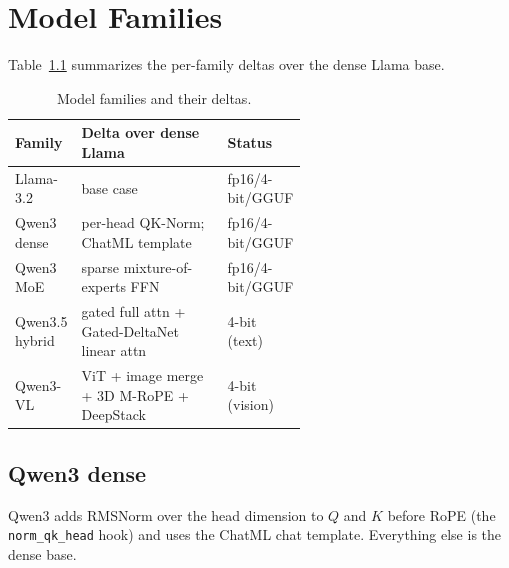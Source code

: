\documentclass[11pt,a4paper]{report}
\newcommand{\code}[1]{\texttt{#1}}
\begin{document}
\chapter{Model Families}
\label{ch:families}

Table~\ref{tab:families} summarizes the per-family deltas over the dense Llama base.

\begin{table}[h]
\centering
\caption{Model families and their deltas.}
\label{tab:families}
\small
\begin{tabular}{@{}l p{0.58\linewidth} l@{}}
\toprule
Family & Delta over dense Llama & Status \\
\midrule
Llama-3.2     & base case                                        & fp16/4-bit/GGUF \\
Qwen3 dense   & per-head QK-Norm; ChatML template                & fp16/4-bit/GGUF \\
Qwen3 MoE     & sparse mixture-of-experts FFN                    & fp16/4-bit/GGUF \\
Qwen3.5 hybrid& gated full attn + Gated-DeltaNet linear attn     & 4-bit (text) \\
Qwen3-VL      & ViT + image merge + 3D M-RoPE + DeepStack        & 4-bit (vision) \\
\bottomrule
\end{tabular}
\end{table}

\section{Qwen3 dense}
Qwen3 adds RMSNorm over the head dimension to $Q$ and $K$ before RoPE (the
\code{norm\_qk\_head} hook) and uses the ChatML chat template. Everything else is the
dense base.
\end{document}
